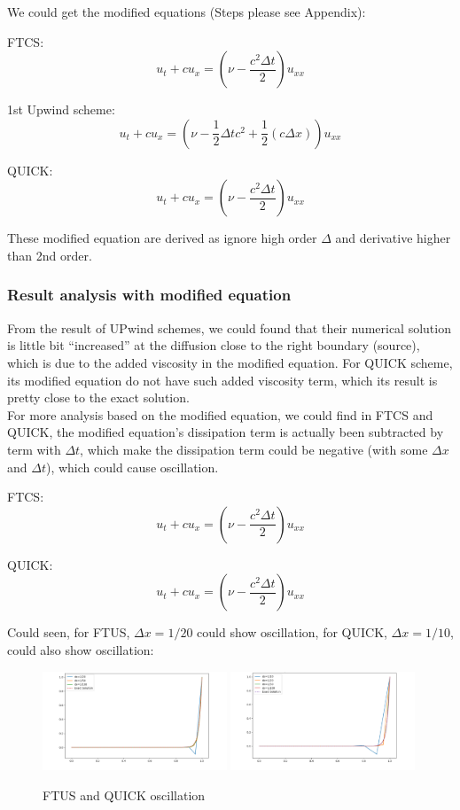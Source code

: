 \documentclass[12pt]{article}
\begin{document}
We could get the modified equations (Steps please see Appendix):

FTCS:
\[ u_t + c u_x = \left( \nu - \frac{c^2 \Delta t}{2} \right) u_{xx} \]

1st Upwind scheme:
\[ u_t + c u_x = \left( \nu - \frac{1}{2} \Delta t c^2 + \frac{1}{2} (c \Delta x) \right) u_{xx} \]

QUICK:
\[ u_t + c u_x = \left( \nu - \frac{c^2 \Delta t}{2} \right) u_{xx} \]

These modified equation are derived as ignore high order 
$\Delta$ and derivative higher than 2nd order.


\subsubsection{Result analysis with modified equation}

From the result of UPwind schemes, we could found that their
numerical solution is little bit ``increased'' at the diffusion
close to the right boundary (source), which is due to 
the added viscosity in the modified equation. For QUICK scheme,
its modified equation do not have such added viscosity term,
which its result is pretty close to the exact solution.\\

For more analysis based on the modified equation, we could
find in FTCS and QUICK, the modified equation's dissipation
term is actually been subtracted by term with $\Delta t$, 
which make the dissipation term could be negative (with some
$\Delta x$ and $\Delta t$), which could cause oscillation.

FTCS:
\[ u_t + c u_x = \left( \nu - \frac{c^2 \Delta t}{2} \right) u_{xx} \]


QUICK:
\[ u_t + c u_x = \left( \nu - \frac{c^2 \Delta t}{2} \right) u_{xx} \]




Could seen, for FTUS, $\Delta x =1/20$ could show oscillation,
for QUICK, $\Delta x =1/10$, could also show oscillation:

\begin{figure}[H]
    \centering
    \includegraphics[width=0.49\textwidth]{figures/P1t0.1All.png}
    \includegraphics[width=0.49\textwidth]{figures/P2Qosc.png}
    \label{IGs.jpg}
    \caption{FTUS and QUICK oscillation}
\end{figure}
\end{document}
